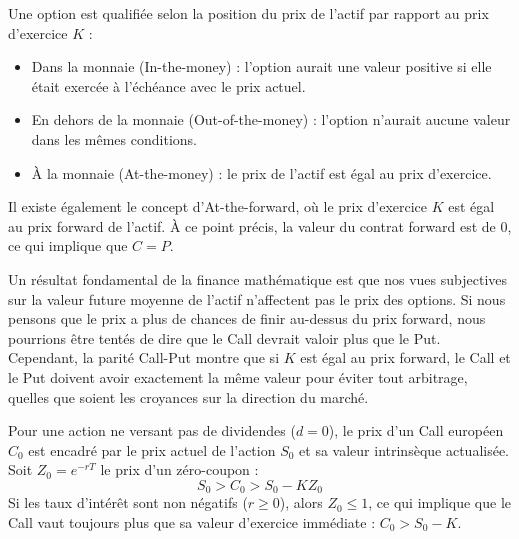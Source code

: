 \begin{definitionbox}
Une option est qualifiée selon la position du prix de l'actif par rapport au prix d'exercice $K$ :
\begin{itemize}[label=$\rightarrow$]
    \item Dans la monnaie (In-the-money) : l'option aurait une valeur positive si elle était exercée à l'échéance avec le prix actuel.
    \item En dehors de la monnaie (Out-of-the-money) : l'option n'aurait aucune valeur dans les mêmes conditions.
    \item À la monnaie (At-the-money) : le prix de l'actif est égal au prix d'exercice.
\end{itemize}
Il existe également le concept d'At-the-forward, où le prix d'exercice $K$ est égal au prix forward de l'actif. À ce point précis, la valeur du contrat forward est de $0$, ce qui implique que $C = P$.
\end{definitionbox}

\begin{intuitionbox}
Un résultat fondamental de la finance mathématique est que nos vues subjectives sur la valeur future moyenne de l'actif n'affectent pas le prix des options. Si nous pensons que le prix a plus de chances de finir au-dessus du prix forward, nous pourrions être tentés de dire que le Call devrait valoir plus que le Put. Cependant, la parité Call-Put montre que si $K$ est égal au prix forward, le Call et le Put doivent avoir exactement la même valeur pour éviter tout arbitrage, quelles que soient les croyances sur la direction du marché.
\end{intuitionbox}

\begin{theorembox}
Pour une action ne versant pas de dividendes ($d = 0$), le prix d'un Call européen $C_0$ est encadré par le prix actuel de l'action $S_0$ et sa valeur intrinsèque actualisée. Soit $Z_0 = e^{-rT}$ le prix d'un zéro-coupon :
\begin{equation*}
    S_0 > C_0 > S_0 - K Z_0
\end{equation*}
Si les taux d'intérêt sont non négatifs ($r \geq 0$), alors $Z_0 \leq 1$, ce qui implique que le Call vaut toujours plus que sa valeur d'exercice immédiate : $C_0 > S_0 - K$.
\end{theorembox}

\newpage

